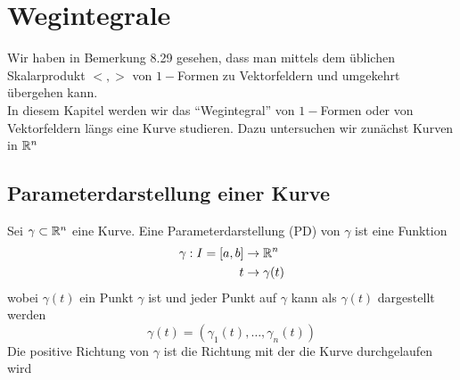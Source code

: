 \section{Wegintegrale}
Wir haben in Bemerkung 8.29 gesehen, dass man mittels dem üblichen Skalarprodukt $<,>$ von $1-$Formen zu Vektorfeldern und umgekehrt übergehen kann. \\

In diesem Kapitel werden wir das ``Wegintegral'' von $1-$Formen oder  von Vektorfeldern längs eine Kurve studieren. Dazu untersuchen wir zunächst Kurven in $\mathbb{R}^n$

\subsection*{Parameterdarstellung einer Kurve}
Sei $\gamma\subset\mathbb{R}^n$ eine Kurve. Eine Parameterdarstellung (PD) von $\gamma$ ist eine Funktion
\begin{align*}
\gamma : I=\lbrack a,b\rbrack &\to\mathbb{R}^n\\
t &\to \gamma (t)
\end{align*}
wobei $\gamma\left( t\right)$ ein Punkt $\gamma$ ist und jeder Punkt auf $\gamma$ kann als $\gamma\left( t\right)$ dargestellt werden
\[\gamma\left( t\right) = \left( \gamma_1 (t),\dots,\gamma_n (t)\right)\]
Die positive Richtung von $\gamma$ ist die Richtung mit der die Kurve durchgelaufen wird
